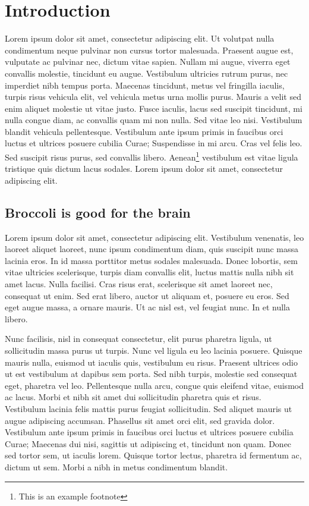 \section{Introduction}

Lorem ipsum dolor sit amet, consectetur adipiscing elit. Ut volutpat
nulla condimentum neque pulvinar non cursus tortor malesuada. Praesent
augue est, vulputate ac pulvinar nec, dictum vitae sapien. Nullam mi
augue, viverra eget convallis molestie, tincidunt eu augue. Vestibulum
ultricies rutrum purus, nec imperdiet nibh tempus porta. Maecenas
tincidunt, metus vel fringilla iaculis, turpis risus vehicula elit, vel
vehicula metus urna mollis purus. Mauris a velit sed enim aliquet
molestie ut vitae justo. Fusce iaculis, lacus sed suscipit tincidunt, mi
nulla congue diam, ac convallis quam mi non nulla. Sed vitae leo nisi.
Vestibulum blandit vehicula pellentesque. Vestibulum ante ipsum primis
in faucibus orci luctus et ultrices posuere cubilia Curae; Suspendisse
in mi arcu. Cras vel felis leo. Sed suscipit risus purus, sed convallis
libero. Aenean\footnote{This is an example footnote} vestibulum est
vitae ligula tristique quis dictum lacus sodales. Lorem ipsum dolor sit
amet, consectetur adipiscing elit.

\subsection{Broccoli is good for the brain}

Lorem ipsum dolor sit amet, consectetur adipiscing elit. Vestibulum
venenatis, leo laoreet aliquet laoreet, nunc ipsum condimentum diam,
quis suscipit nunc massa lacinia eros. In id massa porttitor metus
sodales malesuada. Donec lobortis, sem vitae ultricies scelerisque,
turpis diam convallis elit, luctus mattis nulla nibh sit amet lacus.
Nulla facilisi. Cras risus erat, scelerisque sit amet laoreet nec,
consequat ut enim. Sed erat libero, auctor ut aliquam et, posuere eu
eros. Sed eget augue massa, a ornare mauris. Ut ac nisl est, vel feugiat
nunc. In et nulla libero.

Nunc facilisis, nisl in consequat consectetur, elit purus pharetra
ligula, ut sollicitudin massa purus ut turpis. Nunc vel ligula eu leo
lacinia posuere. Quisque mauris nulla, euismod ut iaculis quis,
vestibulum eu risus. Praesent ultrices odio ut est vestibulum at dapibus
sem porta. Sed nibh turpis, molestie sed consequat eget, pharetra vel
leo. Pellentesque nulla arcu, congue quis eleifend vitae, euismod ac
lacus. Morbi et nibh sit amet dui sollicitudin pharetra quis et risus.
Vestibulum lacinia felis mattis purus feugiat sollicitudin. Sed aliquet
mauris ut augue adipiscing accumsan. Phasellus sit amet orci elit, sed
gravida dolor. Vestibulum ante ipsum primis in faucibus orci luctus et
ultrices posuere cubilia Curae; Maecenas dui nisi, sagittis ut
adipiscing et, tincidunt non quam. Donec sed tortor sem, ut iaculis
lorem. Quisque tortor lectus, pharetra id fermentum ac, dictum ut sem.
Morbi a nibh in metus condimentum blandit.


